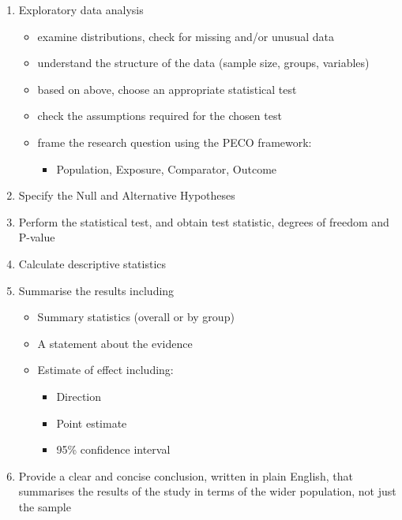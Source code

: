 \documentclass[
  a4paper,
]{memoir}
\providecommand{\tightlist}{%
  \setlength{\itemsep}{0pt}\setlength{\parskip}{0pt}}
\begin{document}
\begin{enumerate}
\def\labelenumi{\arabic{enumi}.}
\setcounter{enumi}{-1}
\tightlist
\item
  Exploratory data analysis

  \begin{itemize}
  \tightlist
  \item
    examine distributions, check for missing and/or unusual data
  \item
    understand the structure of the data (sample size, groups,
    variables)
  \item
    based on above, choose an appropriate statistical test
  \item
    check the assumptions required for the chosen test
  \item
    frame the research question using the PECO framework:

    \begin{itemize}
    \tightlist
    \item
      Population, Exposure, Comparator, Outcome
    \end{itemize}
  \end{itemize}
\item
  Specify the Null and Alternative Hypotheses
\item
  Perform the statistical test, and obtain test statistic, degrees of
  freedom and P-value
\item
  Calculate descriptive statistics
\item
  Summarise the results including

  \begin{itemize}
  \tightlist
  \item
    Summary statistics (overall or by group)
  \item
    A statement about the evidence
  \item
    Estimate of effect including:

    \begin{itemize}
    \tightlist
    \item
      Direction
    \item
      Point estimate
    \item
      95\% confidence interval
    \end{itemize}
  \end{itemize}
\item
  Provide a clear and concise conclusion, written in plain English, that
  summarises the results of the study in terms of the wider population,
  not just the sample
\end{enumerate}
\end{document}
